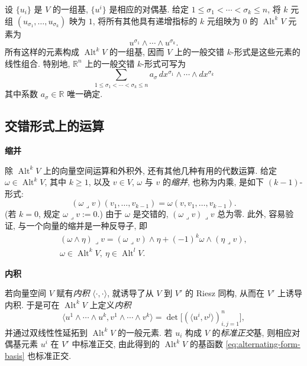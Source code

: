 {设 $\{u_i\}$ 是 $V$ 的一组基, $\{u^i\}$ 是相应的对偶基. 给定 $1\leq\sigma_1<\cdots<\sigma_k\leq n$, 将 $k$ 元组 $(u_{\sigma_1},\ldots,u_{\sigma_k})$ 映为 $1$, 将所有其他具有递增指标的 $k$ 元组映为 $0$ 的 $\operatorname{Alt}^kV$ 元素为}
\begin{equation}\label{eq:alternating-form-basis}
u^{\sigma_1}\wedge\cdots\wedge u^{\sigma_k}.
\end{equation}
{所有这样的元素构成 $\operatorname{Alt}^kV$ 的一组基, 因而 $V$ 上的一般交错 $k$-形式是这些元素的线性组合. 特别地, $\mathbb R^n$ 上的一般交错 $k$-形式可写为}
\[
\sum_{1\leq\sigma_1<\cdots<\sigma_k\leq n}a_\sigma\,dx^{\sigma_1}\wedge\cdots\wedge dx^{\sigma_k}
\]
{其中系数 $a_\sigma\in\mathbb R$ 唯一确定.}

\subsection{{交错形式上的运算}}\label{subsec:alternating-form-operations}

\medskip\noindent\textbf{{缩并}}\par
{除 $\operatorname{Alt}^kV$ 上的向量空间运算和外积外, 还有其他几种有用的代数运算. 给定 $\omega\in\operatorname{Alt}^kV$, 其中 $k\geq1$, 以及 $v\in V$, $\omega$ 与 $v$ 的\emph{缩并}, 也称为内乘, 是如下 $(k-1)$-形式:}
\[
(\omega\lrcorner v)(v_1,\ldots,v_{k-1})=\omega(v,v_1,\ldots,v_{k-1}).
\]
{(若 $k=0$, 规定 $\omega\lrcorner v:=0$.) 由于 $\omega$ 是交错的, $(\omega\lrcorner v)\lrcorner v$ 总为零. 此外, 容易验证, 与一个向量的缩并是一种反导子, 即}
\[
\begin{gathered}
(\omega\wedge\eta)\lrcorner v=(\omega\lrcorner v)\wedge\eta+(-1)^k\omega\wedge(\eta\lrcorner v),\\
\omega\in\operatorname{Alt}^kV,\ \eta\in\operatorname{Alt}^lV.
\end{gathered}
\]

\medskip\noindent\textbf{{内积}}\par
{若向量空间 $V$ 赋有\emph{内积} $\langle\cdot,\cdot\rangle$, 就诱导了从 $V$ 到 $V'$ 的 Riesz 同构, 从而在 $V'$ 上诱导内积. 于是可在 $\operatorname{Alt}^kV$ 上定义\emph{内积}}
\[
\langle u^1\wedge\cdots\wedge u^k,v^1\wedge\cdots\wedge v^k\rangle=\det\big[(\langle u^i,v^j\rangle)_{i,j=1}^n\big],
\]
{并通过双线性性延拓到 $\operatorname{Alt}^kV$ 的一般元素. 若 $u_i$ 构成 $V$ 的\emph{标准正交}基, 则相应对偶基元素 $u^i$ 在 $V'$ 中标准正交, 由此得到的 $\operatorname{Alt}^kV$ 的基函数 \eqref{eq:alternating-form-basis} 也标准正交.}

